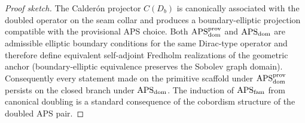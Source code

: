 \begin{proof}[Proof sketch]
The Calder\'on projector $C(D_b)$ is canonically associated with the doubled operator on the
seam collar and produces a boundary-elliptic projection compatible with the provisional APS
choice. Both $\mathrm{APS}_{\mathrm{dom}}^{\mathrm{prov}}$ and $\mathrm{APS}_{\mathrm{dom}}$ are admissible elliptic boundary conditions for the
same Dirac-type operator and therefore define equivalent self-adjoint Fredholm realizations of
the geometric anchor (boundary-elliptic equivalence preserves the Sobolev graph domain).
Consequently every statement made on the primitive scaffold under $\mathrm{APS}_{\mathrm{dom}}^{\mathrm{prov}}$ persists on the
closed branch under $\mathrm{APS}_{\mathrm{dom}}$. The induction of $\mathrm{APS}_{\mathrm{fam}}$ from canonical doubling is a standard
consequence of the cobordism structure of the doubled APS pair.
\end{proof}

